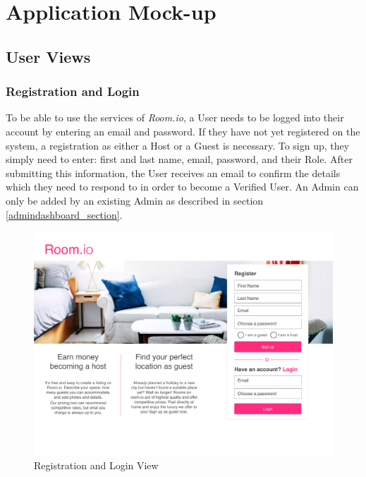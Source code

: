 \chapter{Application Mock-up}
\label{chapter:mockups}

\section{User Views}
\subsection{Registration and Login}
To be able to use the services of \textit{Room.io}, a User needs to be logged into their account by entering an email and password. If they have not yet registered on the system, a registration as either a Host or a Guest is necessary. To sign up, they simply need to enter: first and last name, email, password, and their Role. After submitting this information, the User receives an email to confirm the details which they need to respond to in order to become a Verified User. An Admin can only be added by an existing Admin as described in section \ref{admindashboard_section}.
 
\begin{figure}[H]
  \centering
  \includegraphics[width=17cm]{img/mockups/user_registration.pdf}
  \caption{Registration and Login View}
  \label{Registration_Login_View}
\end{figure}

